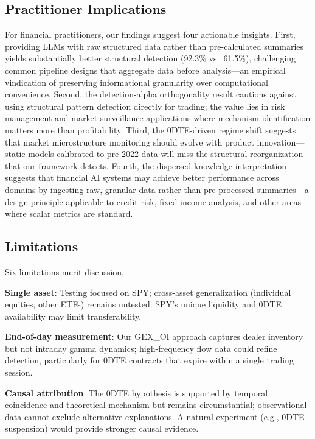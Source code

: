 \subsection{Practitioner Implications}

For financial practitioners, our findings suggest four actionable insights. First, providing LLMs with raw structured data rather than pre-calculated summaries yields substantially better structural detection (92.3\% vs.\ 61.5\%), challenging common pipeline designs that aggregate data before analysis---an empirical vindication of preserving informational granularity over computational convenience. Second, the detection-alpha orthogonality result cautions against using structural pattern detection directly for trading; the value lies in risk management and market surveillance applications where mechanism identification matters more than profitability. Third, the 0DTE-driven regime shift suggests that market microstructure monitoring should evolve with product innovation---static models calibrated to pre-2022 data will miss the structural reorganization that our framework detects. Fourth, the dispersed knowledge interpretation suggests that financial AI systems may achieve better performance across domains by ingesting raw, granular data rather than pre-processed summaries---a design principle applicable to credit risk, fixed income analysis, and other areas where scalar metrics are standard.

\subsection{Limitations}

Six limitations merit discussion.

\noindent\textbf{Single asset}: Testing focused on SPY; cross-asset generalization (individual equities, other ETFs) remains untested. SPY's unique liquidity and 0DTE availability may limit transferability.

\noindent\textbf{End-of-day measurement}: Our GEX\_OI approach captures dealer inventory but not intraday gamma dynamics; high-frequency flow data could refine detection, particularly for 0DTE contracts that expire within a single trading session.

\noindent\textbf{Causal attribution}: The 0DTE hypothesis is supported by temporal coincidence and theoretical mechanism but remains circumstantial; observational data cannot exclude alternative explanations. A natural experiment (e.g., 0DTE suspension) would provide stronger causal evidence.

